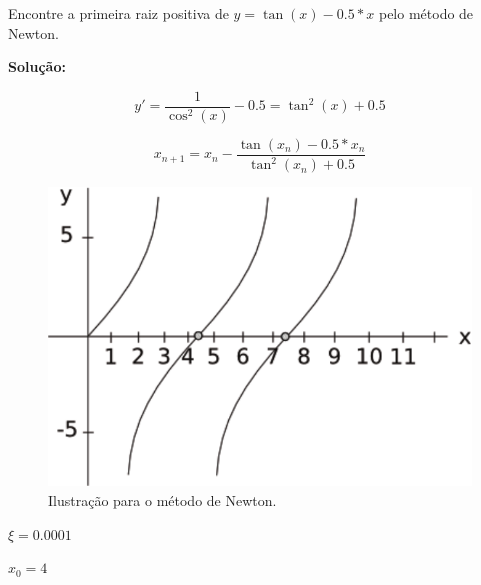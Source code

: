 \begin{example}
\label{ex:newton1}

Encontre a primeira raiz positiva de $y = \tan(x) - 0.5 \ast x$ pelo método de Newton.

\textbf{Solução:}

\[
 y' = \frac{1}{\cos^{2}(x)} - 0.5 = \tan^{2}(x) + 0.5
\]

\[
 x_{n+1} = x_{n} - \frac{\tan(x_{n}) - 0.5 \ast x_{n}}{\tan^{2}(x_{n}) + 0.5}
\]

\begin{figure}[htb]
  \setlength{\abovecaptionskip}{20pt}
  \centering
  \includegraphics[scale=0.8]{capitulos/capitulo1/figuras/newton2-eps-converted-to.pdf}
  \caption{Ilustração para o método de Newton.}
  \label{fig:newton2}
\end{figure}

\begin{enumerar}
\item $\xi = 0.0001$

\item $x_{0} = 4$


\end{enumerar}
\end{example}
